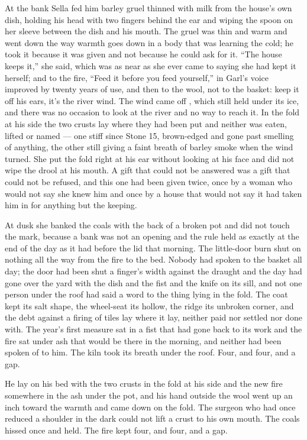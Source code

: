 At the bank Sella fed him barley gruel thinned with milk from the house's own dish, holding his head with two fingers behind the ear and wiping the spoon on her sleeve between the dish and his mouth. The gruel was thin and warm and went down the way warmth goes down in a body that was learning the cold; he took it because it was given and not because he could ask for it. “The house keeps it,” she said, which was as near as she ever came to saying she had kept it herself; and to the fire, “Feed it before you feed yourself,” in Garl's voice improved by twenty years of use, and then to the wool, not to the basket: keep it off his ears, it's the river wind. The wind came off , which still held under its ice, and there was no occasion to look at the river and no way to reach it. In the fold at his side the two crusts lay where they had been put and neither was eaten, lifted or named --- one stiff since Stone 15, brown-edged and gone past smelling of anything, the other still giving a faint breath of barley smoke when the wind turned. She put the fold right at his ear without looking at his face and did not wipe the drool at his mouth. A gift that could not be answered was a gift that could not be refused, and this one had been given twice, once by a woman who would not say she knew him and once by a house that would not say it had taken him in for anything but the keeping.

At dusk she banked the coals with the back of a broken pot and did not touch the mark, because a bank was not an opening and the rule held as exactly at the end of the day as it had before the lid that morning. The little-door burn shut on nothing all the way from the fire to the bed. Nobody had spoken to the basket all day; the door had been shut a finger's width against the draught and the day had gone over the yard with the dish and the fist and the knife on its sill, and not one person under the roof had said a word to the thing lying in the fold. The coat kept its salt shape, the wheel-seat its hollow, the ridge its unbroken corner, and the debt against a firing of tiles lay where it lay, neither paid nor settled nor done with. The year's first measure sat in a fist that had gone back to its work and the fire sat under ash that would be there in the morning, and neither had been spoken of to him. The kiln took its breath under the roof. Four, and four, and a gap.

He lay on his bed with the two crusts in the fold at his side and the new fire somewhere in the ash under the pot, and his hand outside the wool went up an inch toward the warmth and came down on the fold. The surgeon who had once reduced a shoulder in the dark could not lift a crust to his own mouth. The coals hissed once and held. The fire kept four, and four, and a gap.

